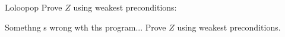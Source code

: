 \documentclass[
  english
]{tumteaching}
\begin{document}
\clearpage
\begin{assignment}[H,points=8]{Loloopop}
	Prove $Z$ using weakest preconditions:
	\begin{center}
		\begin{tikzpicture}
			
		\end{tikzpicture}
	\end{center}

	\noindent {}

\end{assignment}

\clearpage
\begin{assignment}[H, points=3]{Somethng s wrong wth ths program...}
	Prove $Z$ using weakest preconditions.
	\begin{center}
		\begin{tikzpicture}
			
		\end{tikzpicture}
	\end{center}

\end{assignment}
\end{document}
